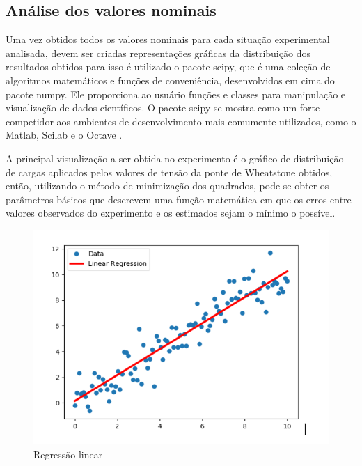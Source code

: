 \subsection{Análise dos valores nominais}

Uma vez obtidos todos os valores nominais para cada situação experimental analisada, devem ser criadas representações gráficas da distribuição dos resultados obtidos para
isso é utilizado o pacote scipy, que é uma coleção de algoritmos matemáticos e funções de conveniência, desenvolvidos em cima do pacote numpy. Ele proporciona ao usuário
funções e classes para manipulação e visualização de dados científicos. O pacote scipy se mostra como um forte competidor aos ambientes de desenvolvimento mais comumente
utilizados, como o Matlab, Scilab e o Octave \autocite{DocsSciPy}.

A principal visualização a ser obtida no experimento é o gráfico de distribuição de cargas aplicados pelos valores de tensão da ponte de Wheatstone obtidos, então, utilizando
o método de minimização dos quadrados, pode-se obter os parâmetros básicos que descrevem uma função matemática em que os erros entre valores observados do experimento e os
estimados sejam o mínimo o possível.

\begin{figure}[htb]
	\caption{\label{fig:1160} Regressão linear}
	\begin{center}
		\includegraphics[width=\textwidth]{pictures/1160.png}
	\end{center}
\end{figure}

